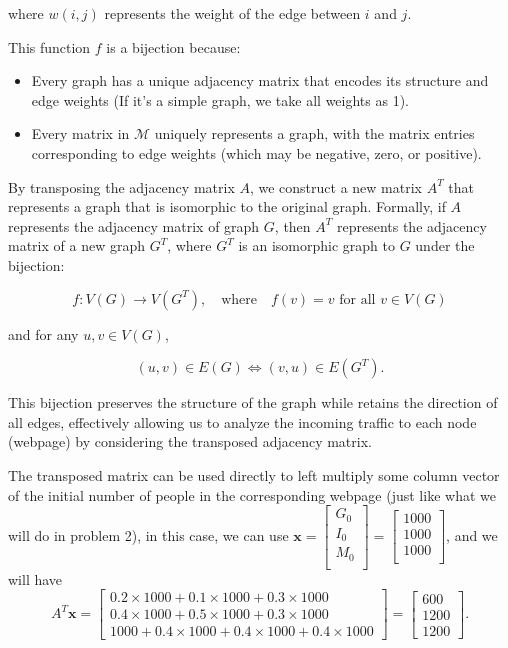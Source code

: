 \documentclass[12pt,a4paper]{article}
\begin{document}
\begin{solution}
\begin{remark}
where \( w(i,j) \) represents the weight of the edge between \( i \) and \( j \).

This function \( f \) is a bijection because:

\begin{itemize}
    \item Every graph has a unique adjacency matrix that encodes its structure and edge weights (If it's a simple graph, we take all weights as 1).
    \item Every matrix in \( \mathcal{M} \) uniquely represents a graph, with the matrix entries corresponding to edge weights (which may be negative, zero, or positive).
\end{itemize}



By transposing the adjacency matrix \( A \), we construct a new matrix \( A^T \) that represents a graph that is isomorphic to the original graph. Formally, if \( A \) represents the adjacency matrix of graph \( G \), then \( A^T \) represents the adjacency matrix of a new graph \( G^T \), where \( G^T \) is an isomorphic graph to \( G \) under the bijection:

\[
f: V(G) \rightarrow V(G^T), \quad \text{where} \quad f(v) = v \text{ for all } v \in V(G)
\]

and for any \( u, v \in V(G) \),

\[
(u, v) \in E(G) \iff (v, u) \in E(G^T).
\]

This bijection preserves the structure of the graph while retains the direction of all edges, effectively allowing us to analyze the incoming traffic to each node (webpage) by considering the transposed adjacency matrix.

The transposed matrix can be used directly to left multiply some column vector of the initial number of people in the corresponding webpage (just like what we will do in problem 2), in this case, we can use 
$\mathbf{x} = 
\begin{bmatrix}
    G_0 \\
    I_0 \\
     M_0\\
\end{bmatrix}
=
\begin{bmatrix}
    1000 \\
    1000 \\
    1000 \\
\end{bmatrix}
$,
and we will have 
\[
A^T \mathbf{x} = \begin{bmatrix}
    0.2\times 1000+0.1\times 1000+0.3\times 1000\\
    0.4\times 1000+0.5\times 1000+0.3\times 1000\\
    1000+0.4\times 1000+0.4\times 1000 +0.4 \times 1000
\end{bmatrix}
=
\begin{bmatrix}
    600\\
    1200\\
    1200
\end{bmatrix}.
\]


\end{remark}
\end{solution}
\end{document}
